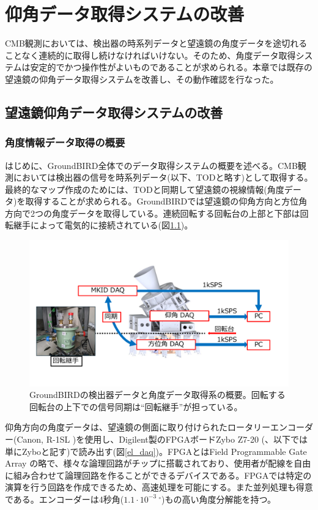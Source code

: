 \chapter{仰角データ取得システムの改善}
\label{chapter3}

CMB観測においては、検出器の時系列データと望遠鏡の角度データを途切れることなく連続的に取得し続けなければいけない。そのため、角度データ取得システムは安定的でかつ操作性がよいものであることが求められる。本章では既存の望遠鏡の仰角データ取得システムを改善し、その動作確認を行なった。
\section{望遠鏡仰角データ取得システムの改善}

\subsection{角度情報データ取得の概要}
はじめに、GroundBIRD全体でのデータ取得システムの概要を述べる。CMB観測においては検出器の信号を時系列データ(以下、TODと略す)として取得する。最終的なマップ作成のためには、TODと同期して望遠鏡の視線情報(角度データ)を取得することが求められる。GroundBIRDでは望遠鏡の仰角方向と方位角方向で2つの角度データを取得している。連続回転する回転台の上部と下部は回転継手\cite{rotary_joint}によって電気的に接続されている(図\ref{GB_daq})。

\begin{figure}[htbp]
  \centering
  \includegraphics[width=1.0\columnwidth]{4_elDAQ/figs/GB_daq_2.pdf}
  \caption{GroundBIRDの検出器データと角度データ取得系の概要。回転する回転台の上下での信号同期は``回転継手''が担っている。}
  \label{GB_daq}
\end{figure}

仰角方向の角度データは、望遠鏡の側面に取り付けられたロータリーエンコーダー(Canon, R-1SL \cite{R-1SL})を使用し、Digilent製のFPGAボードZybo Z7-20 (\cite{Zybo}、以下では単にZyboと記す)で読み出す(図\ref{el_daq})。FPGAとはField Programmable Gate Array の略で、様々な論理回路がチップに搭載されており、使用者が配線を自由に組み合わせて論理回路を作ることができるデバイスである。FPGAでは特定の演算を行う回路を作成できるため、高速処理を可能にする。また並列処理も得意である。エンコーダーは4秒角($1.1\cdot{10^{-3}}~^{\circ}$)もの高い角度分解能を持つ。

